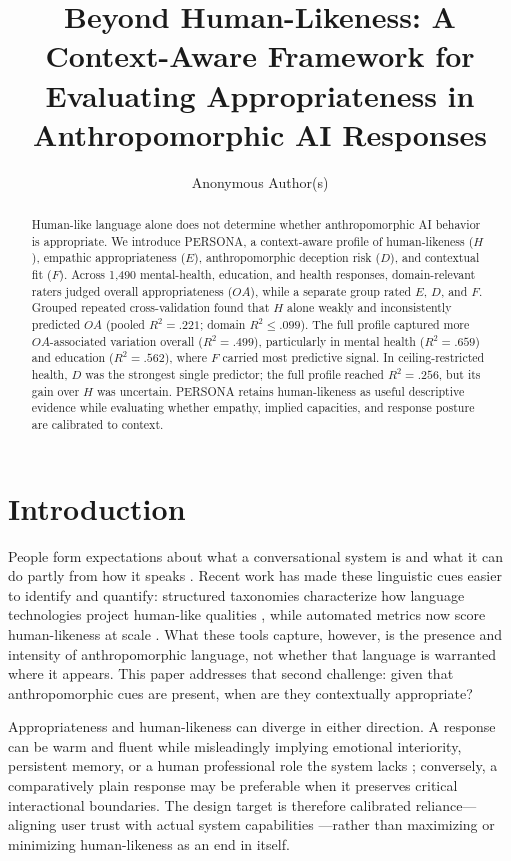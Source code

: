 \documentclass[manuscript,review,anonymous]{acmart}
\title{Beyond Human-Likeness: A Context-Aware Framework for Evaluating Appropriateness in Anthropomorphic AI Responses}
\author{Anonymous Author(s)}
\affiliation{%
  \institution{Anonymous Institution}
  \country{}}
\begin{document}
\begin{abstract}
Human-like language alone does not determine whether anthropomorphic AI behavior is appropriate. We introduce PERSONA, a context-aware profile of human-likeness ($H$), empathic appropriateness ($E$), anthropomorphic deception risk ($D$), and contextual fit ($F$). Across 1,490 mental-health, education, and health responses, domain-relevant raters judged overall appropriateness ($OA$), while a separate group rated $E$, $D$, and $F$. Grouped repeated cross-validation found that $H$ alone weakly and inconsistently predicted $OA$ (pooled $R^2=.221$; domain $R^2\leq.099$). The full profile captured more $OA$-associated variation overall ($R^2=.499$), particularly in mental health ($R^2=.659$) and education ($R^2=.562$), where $F$ carried most predictive signal. In ceiling-restricted health, $D$ was the strongest single predictor; the full profile reached $R^2=.256$, but its gain over $H$ was uncertain. PERSONA retains human-likeness as useful descriptive evidence while evaluating whether empathy, implied capacities, and response posture are calibrated to context.
\end{abstract}


\maketitle

\section{Introduction}

People form expectations about what a conversational system is and what it can do partly from how it speaks \cite{nass2000, reeves1996}. Recent work has made these linguistic cues easier to identify and quantify: structured taxonomies characterize how language technologies project human-like qualities \cite{abercrombie2023, devrio2025}, while automated metrics now score human-likeness at scale \cite{cheng2025}. What these tools capture, however, is the presence and intensity of anthropomorphic language, not whether that language is warranted where it appears. This paper addresses that second challenge: given that anthropomorphic cues are present, when are they contextually appropriate?

Appropriateness and human-likeness can diverge in either direction. A response can be warm and fluent while misleadingly implying emotional interiority, persistent memory, or a human professional role the system lacks \cite{leong2019, Shanahan2024Talking}; conversely, a comparatively plain response may be preferable when it preserves critical interactional boundaries. The design target is therefore calibrated reliance---aligning user trust with actual system capabilities \cite{lee2004}---rather than maximizing or minimizing human-likeness as an end in itself.
\end{document}
